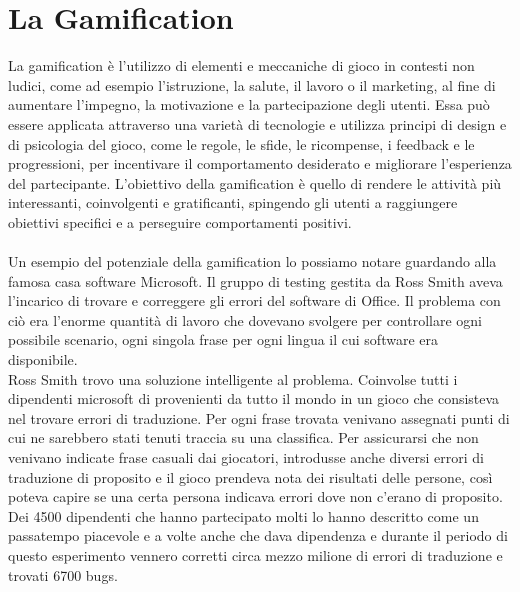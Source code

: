 \chapter{La Gamification}
La gamification è l'utilizzo di elementi e meccaniche di gioco in contesti non ludici, come ad esempio l'istruzione, la salute, il lavoro o il marketing, al fine di aumentare l'impegno, la motivazione e la partecipazione degli utenti. Essa può essere applicata attraverso una varietà di tecnologie e utilizza principi di design e di psicologia del gioco, come le regole, le sfide, le ricompense, i feedback e le progressioni, per incentivare il comportamento desiderato e migliorare l'esperienza del partecipante.
L'obiettivo della gamification è quello di rendere le attività più interessanti, coinvolgenti e gratificanti, spingendo gli utenti a raggiungere obiettivi specifici e a perseguire comportamenti positivi.\\
\\
Un esempio del potenziale della gamification lo possiamo notare guardando alla famosa casa software Microsoft. Il gruppo di testing gestita da Ross Smith aveva l'incarico di trovare e correggere gli errori del software di Office. Il problema con ciò era l'enorme quantità di lavoro che dovevano svolgere per controllare ogni possibile scenario, ogni singola frase per ogni lingua il cui software era disponibile.\\
Ross Smith trovo una soluzione intelligente al problema. Coinvolse tutti i dipendenti microsoft di provenienti da tutto il mondo in un gioco che consisteva nel trovare errori di traduzione. Per ogni frase trovata venivano assegnati punti di cui ne sarebbero stati tenuti traccia su una classifica. Per assicurarsi che non venivano indicate frase casuali dai giocatori, introdusse anche diversi errori di traduzione di proposito e il gioco prendeva nota dei risultati delle persone, così poteva capire se una certa persona indicava errori dove non c'erano di proposito.
Dei 4500 dipendenti che hanno partecipato molti lo hanno descritto come un passatempo piacevole e a volte anche che dava dipendenza e durante il periodo di questo esperimento vennero corretti circa mezzo milione di errori di traduzione e trovati 6700 bugs.

